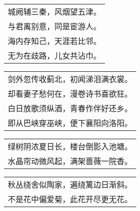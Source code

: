 \noindent\begin{minipage}{\linewidth}
  \vskip-3pt\begin{table}[H]
    \centering
    \begin{tabular}{@{}l@{}}
城阙辅三秦，风烟望五津。\\
与君离别意，同是宦游人。\\
海内存知己，天涯若比邻。\\
无为在歧路，儿女共沾巾。
    \end{tabular}
  \end{table}
\end{minipage}
\vspace{1cm}


\noindent\begin{minipage}{\linewidth}
  \vskip-3pt\begin{table}[H]
    \centering
    \begin{tabular}{@{}l@{}}
剑外忽传收蓟北，初闻涕泪满衣裳。\\
却看妻子愁何在，漫卷诗书喜欲狂。\\
白日放歌须纵酒，青春作伴好还乡。\\
即从巴峡穿巫峡，便下襄阳向洛阳。
    \end{tabular}
  \end{table}
\end{minipage}
\vspace{1cm}


\noindent\begin{minipage}{\linewidth}
  \vskip-3pt\begin{table}[H]
    \centering
    \begin{tabular}{@{}l@{}}
绿树阴浓夏日长，楼台倒影入池塘。\\
水晶帘动微风起，满架蔷薇一院香。
    \end{tabular}
  \end{table}
\end{minipage}
\vspace{1cm}


\noindent\begin{minipage}{\linewidth}
  \vskip-3pt\begin{table}[H]
    \centering
    \begin{tabular}{@{}l@{}}
秋丛绕舍似陶家，遍绕篱边日渐斜。\\
不是花中偏爱菊，此花开尽更无花。
    \end{tabular}
  \end{table}
\end{minipage}
\vspace{1cm}


